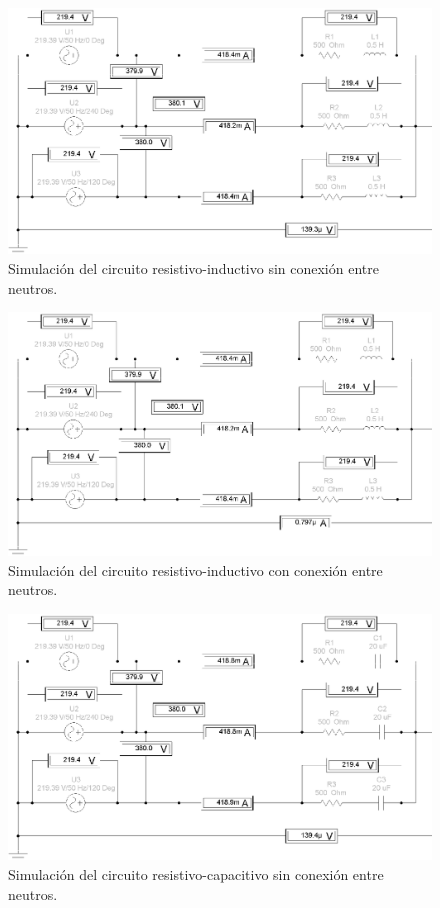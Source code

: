 \documentclass[letter,11pt]{article}
\begin{document}
\begin{figure}[!h]
\centering
\includegraphics[scale=0.88]{simulacion/practica1.3.eps}
\caption{Simulación del circuito resistivo-inductivo sin conexión entre neutros.}
\label{simulacion3}
\end{figure}

\begin{figure}[!h]
\centering
\includegraphics[scale=0.88]{simulacion/practica1.4.eps}
\caption{Simulación del circuito resistivo-inductivo con conexión entre neutros.}
\label{simulacion4}
\end{figure}

\newpage

\begin{figure}[!h]
\centering
\includegraphics[scale=0.88]{simulacion/practica1.5.eps}
\caption{Simulación del circuito resistivo-capacitivo sin conexión entre neutros.}
\label{simulacion5}
\end{figure}
\end{document}
